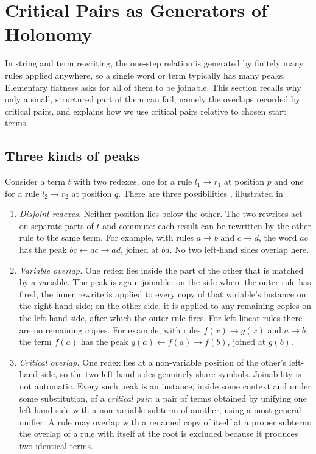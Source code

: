 \section{Critical Pairs as Generators of Holonomy}
\label{sec:critical-pairs-curvature}

In string and term rewriting, the one-step relation is generated by finitely many rules applied anywhere, so a single word or term typically has many peaks. Elementary flatness asks for all of them to be joinable. This section recalls why only a small, structured part of them can fail, namely the overlaps recorded by critical pairs, and explains how we use critical pairs relative to chosen start terms.

\subsection{Three kinds of peaks}
\label{subsec:three-kinds-of-peaks}

Consider a term $t$ with two redexes, one for a rule $l_1 \to r_1$ at position $p$ and one for a rule $l_2 \to r_2$ at position $q$. There are three possibilities \cite{Huet1980,BaaderNipkow1998,Terese2003}, illustrated in .

\begin{enumerate}
    \item \emph{Disjoint redexes.} Neither position lies below the other. The two rewrites act on separate parts of $t$ and commute: each result can be rewritten by the other rule to the same term. For example, with rules $a \to b$ and $c \to d$, the word $ac$ has the peak $bc \leftarrow ac \to ad$, joined at $bd$. No two left-hand sides overlap here.
    \item \emph{Variable overlap.} One redex lies inside the part of the other that is matched by a variable. The peak is again joinable: on the side where the outer rule has fired, the inner rewrite is applied to every copy of that variable's instance on the right-hand side; on the other side, it is applied to any remaining copies on the left-hand side, after which the outer rule fires. For left-linear rules there are no remaining copies. For example, with rules $f(x) \to g(x)$ and $a \to b$, the term $f(a)$ has the peak $g(a) \leftarrow f(a) \to f(b)$, joined at $g(b)$.
    \item \emph{Critical overlap.} One redex lies at a non-variable position of the other's left-hand side, so the two left-hand sides genuinely share symbols. Joinability is not automatic. Every such peak is an instance, inside some context and under some substitution, of a \emph{critical pair}: a pair of terms obtained by unifying one left-hand side with a non-variable subterm of another, using a most general unifier. A rule may overlap with a renamed copy of itself at a proper subterm; the overlap of a rule with itself at the root is excluded because it produces two identical terms.
\end{enumerate}

